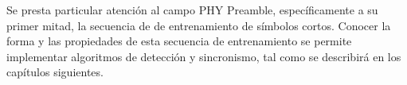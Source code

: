 Se presta particular atención al campo PHY Preamble, específicamente a su primer mitad, la secuencia de de entrenamiento de símbolos cortos. Conocer la forma y las propiedades de esta secuencia de entrenamiento se permite implementar algoritmos de detección y sincronismo, tal como se describirá en los capítulos siguientes.

